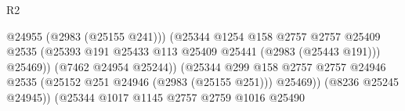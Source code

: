 \begin{lexlean}{R2}
\begin{coremodule}
                                                                @24955
                                                                (@2983 (@25155 @241)))
                                                              (@25344
                                                                @1254
                                                                @158
                                                                @2757
                                                                @2757
                                                                @25409
                                                                @2535
                                                                (@25393
                                                                  @191
                                                                  @25433
                                                                  @113
                                                                  @25409
                                                                  @25441
                                                                  (@2983 (@25443 @191)))
                                                                @25469))
                                                            (@7462 @24954 @25244))
                                                          (@25344
                                                            @299
                                                            @158
                                                            @2757
                                                            @2757
                                                            @24946
                                                            @2535
                                                            (@25152
                                                              @251
                                                              @24946
                                                              (@2983 (@25155 @251)))
                                                            @25469))
                                                        (@8236 @25245 @24945))
                                                      (@25344
                                                        @1017
                                                        @1145
                                                        @2757
                                                        @2759
                                                        @1016
                                                        @25490

\end{coremodule}
\end{lexlean}
